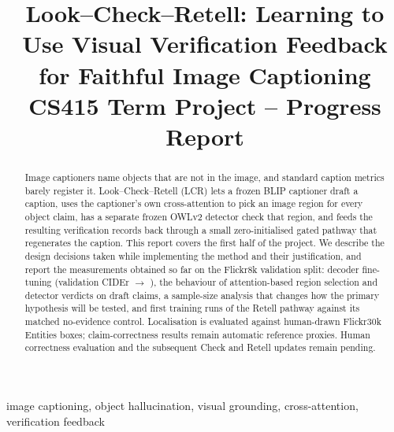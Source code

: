 \documentclass[conference]{IEEEtran}
\begin{document}
\title{Look--Check--Retell: Learning to Use Visual Verification Feedback for Faithful Image Captioning\\[2pt]
\large CS415 Term Project -- Progress Report}

\author{
}

\maketitle

\begin{abstract}
Image captioners name objects that are not in the image, and standard caption metrics barely register it. Look--Check--Retell (LCR) lets a frozen BLIP captioner draft a caption, uses the captioner's own cross-attention to pick an image region for every object claim, has a separate frozen OWLv2 detector check that region, and feeds the resulting verification records back through a small zero-initialised gated pathway that regenerates the caption. This report covers the first half of the project. We describe the design decisions taken while implementing the method and their justification, and report the measurements obtained so far on the Flickr8k validation split: decoder fine-tuning (validation CIDEr \ZsCIDEr{} $\to$ \FtCIDEr{}), the behaviour of attention-based region selection and detector verdicts on \ValClaims{} draft claims, a sample-size analysis that changes how the primary hypothesis will be tested, and first training runs of the Retell pathway against its matched no-evidence control. Localisation is evaluated against human-drawn Flickr30k Entities boxes; claim-correctness results remain automatic reference proxies. Human correctness evaluation and the subsequent Check and Retell updates remain pending.
\end{abstract}

\begin{IEEEkeywords}
image captioning, object hallucination, visual grounding, cross-attention, verification feedback
\end{IEEEkeywords}






\end{document}
